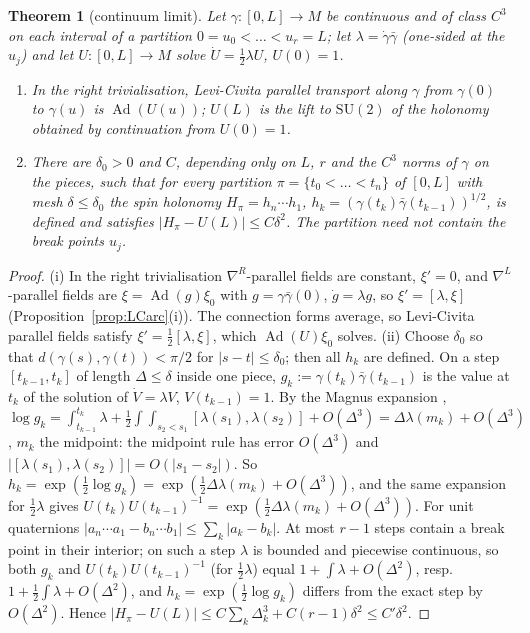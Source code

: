 \documentclass[11pt,reqno]{amsart}
\newtheorem{theorem}{Theorem}[section]
\theoremstyle{definition}
\theoremstyle{remark}
\numberwithin{equation}{section}
\newcommand{\Ad}{\operatorname{Ad}}
\newcommand{\SU}{\mathrm{SU}}
\begin{document}
\begin{theorem}[continuum limit]\label{thm:continuum}
Let $\gamma\colon[0,L]\to M$ be continuous and of class $C^3$ on each interval of a partition $0=u_0<\dots<u_r=L$; let
$\lambda=\dot\gamma\bar\gamma$ (one-sided at the $u_j$) and let $U\colon[0,L]\to M$ solve $\dot U=\tfrac12\lambda U$, $U(0)=1$.
\begin{enumerate}[label=(\roman*)]
\item In the right trivialisation, Levi-Civita parallel transport along $\gamma$ from $\gamma(0)$ to $\gamma(u)$ is $\Ad(U(u))$;
$U(L)$ is the lift to $\SU(2)$ of the holonomy obtained by continuation from $U(0)=1$.
\item There are $\delta_0>0$ and $C$, depending only on $L$, $r$ and the $C^3$ norms of $\gamma$ on the pieces, such that for
every partition $\pi=\{t_0<\dots<t_n\}$ of $[0,L]$ with mesh $\delta\le\delta_0$ the spin holonomy $H_\pi=h_n\cdots h_1$,
$h_k=(\gamma(t_k)\bar\gamma(t_{k-1}))^{1/2}$, is defined and satisfies $\lvert H_\pi-U(L)\rvert\le C\delta^2$.  The partition need not
contain the break points $u_j$.
\end{enumerate}
\end{theorem}
\begin{proof}
(i) In the right trivialisation $\nabla^R$-parallel fields are constant, $\xi'=0$, and $\nabla^L$-parallel fields are
$\xi=\Ad(g)\xi_0$ with $g=\gamma\bar\gamma(0)$, $\dot g=\lambda g$, so $\xi'=[\lambda,\xi]$ (Proposition~\ref{prop:LCarc}(i)).  The
connection forms average, so Levi-Civita parallel fields satisfy $\xi'=\tfrac12[\lambda,\xi]$, which $\Ad(U)\xi_0$ solves.
(ii) Choose $\delta_0$ so that $d(\gamma(s),\gamma(t))<\pi/2$ for $\lvert s-t\rvert\le\delta_0$; then all $h_k$ are defined.  On a step
$[t_{k-1},t_k]$ of length $\Delta\le\delta$ inside one piece, $g_k:=\gamma(t_k)\bar\gamma(t_{k-1})$ is the value at $t_k$
of the solution of $\dot V=\lambda V$, $V(t_{k-1})=1$.  By the Magnus expansion \cite{Magnus,IMNZ},
$\log g_k=\int_{t_{k-1}}^{t_k}\lambda+\tfrac12\int\!\!\int_{s_2<s_1}[\lambda(s_1),\lambda(s_2)]+O(\Delta^3)=\Delta\lambda(m_k)+O(\Delta^3)$, $m_k$ the
midpoint: the midpoint rule has error $O(\Delta^3)$ and $\lvert[\lambda(s_1),\lambda(s_2)]\rvert=O(\lvert s_1-s_2\rvert)$.  So
$h_k=\exp(\tfrac12\log g_k)=\exp(\tfrac12\Delta\lambda(m_k)+O(\Delta^3))$, and the same expansion for $\tfrac12\lambda$ gives
$U(t_k)U(t_{k-1})^{-1}=\exp(\tfrac12\Delta\lambda(m_k)+O(\Delta^3))$.  For unit quaternions
$\lvert a_n\cdots a_1-b_n\cdots b_1\rvert\le\sum_k\lvert a_k-b_k\rvert$.  At most $r-1$ steps contain a break point in their
interior; on such a step $\lambda$ is bounded and piecewise continuous, so both $g_k$ and $U(t_k)U(t_{k-1})^{-1}$ (for $\tfrac12\lambda$)
equal $1+\int\lambda+O(\Delta^2)$, resp.\ $1+\tfrac12\int\lambda+O(\Delta^2)$, and $h_k=\exp(\tfrac12\log g_k)$ differs from the exact
step by $O(\Delta^2)$.  Hence $\lvert H_\pi-U(L)\rvert\le C\sum_k\Delta_k^3+C(r-1)\delta^2\le C'\delta^2$.
\end{proof}
\end{document}
